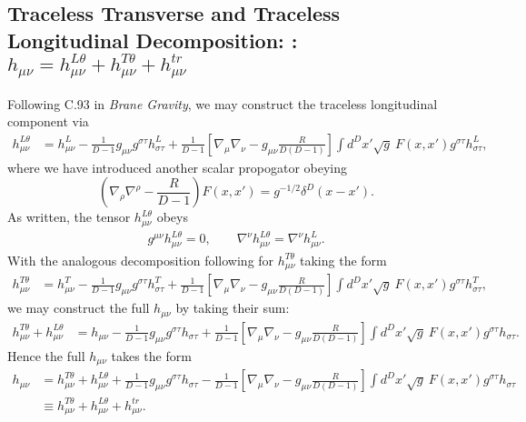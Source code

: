 \documentclass[10pt,letterpaper]{article}
\numberwithin{equation}{subsection}
\begin{document}
\subsection{Traceless Transverse and Traceless Longitudinal Decomposition: : $h_{\mu\nu} = h^{L\theta}_{\mu\nu}+h^{T\theta}_{\mu\nu}+h^{tr}_{\mu\nu}$}
Following C.93 in \emph{Brane Gravity}, we may construct the traceless longitudinal component via
\begin{align}
h_{\mu\nu}^{L\theta} &= h_{\mu\nu}^L - \frac{1}{D-1} g_{\mu\nu} g^{\sigma\tau}h^L_{\sigma\tau} +\frac{1}{D-1}
\left[ \nabla_\mu\nabla_\nu- g_{\mu\nu}\frac{R}{D(D-1)}\right] \int d^Dx' \sqrt{g}\ F(x,x')g^{\sigma\tau}h_{\sigma\tau}^L ,
\end{align}
where we have introduced another scalar propogator obeying
\begin{equation}
\left( \nabla_\rho \nabla^\rho - \frac{R}{D-1}\right)F(x,x') = g^{-1/2} \delta^D (x-x').
\end{equation}
As written, the tensor $h_{\mu\nu}^{L\theta}$ obeys
\begin{align}
g^{\mu\nu}h_{\mu\nu}^{L\theta} = 0,\qquad \nabla^\nu h_{\mu\nu}^{L\theta} = \nabla^\nu h_{\mu\nu}^{L}.
\end{align}
With the analogous decomposition following for $h_{\mu\nu}^{T\theta}$ taking the form
\begin{align}
h_{\mu\nu}^{T\theta} &= h_{\mu\nu}^T - \frac{1}{D-1} g_{\mu\nu} g^{\sigma\tau}h^T_{\sigma\tau} +\frac{1}{D-1}
\left[ \nabla_\mu\nabla_\nu- g_{\mu\nu}\frac{R}{D(D-1)}\right] \int d^Dx' \sqrt{g}\ F(x,x')g^{\sigma\tau}h_{\sigma\tau}^T ,
\end{align}
we may construct the full $h_{\mu\nu}$ by taking their sum:
\begin{align}
h_{\mu\nu}^{T\theta}+h_{\mu\nu}^{L\theta}&= h_{\mu\nu} - \frac{1}{D-1} g_{\mu\nu} g^{\sigma\tau}h_{\sigma\tau} +\frac{1}{D-1}
\left[ \nabla_\mu\nabla_\nu- g_{\mu\nu}\frac{R}{D(D-1)}\right] \int d^Dx' \sqrt{g}\ F(x,x')g^{\sigma\tau}h_{\sigma\tau}.
\end{align}
Hence the full $h_{\mu\nu}$ takes the form
\begin{align}
h_{\mu\nu}&= h_{\mu\nu}^{T\theta}+h_{\mu\nu}^{L\theta} + \frac{1}{D-1} g_{\mu\nu} g^{\sigma\tau}h_{\sigma\tau} -\frac{1}{D-1}
\left[ \nabla_\mu\nabla_\nu- g_{\mu\nu}\frac{R}{D(D-1)}\right] \int d^Dx' \sqrt{g}\ F(x,x')g^{\sigma\tau}h_{\sigma\tau}
\nonumber\\
&\equiv h_{\mu\nu}^{T\theta}+h_{\mu\nu}^{L\theta}+h^{tr}_{\mu\nu}.
\end{align}
\end{document}
